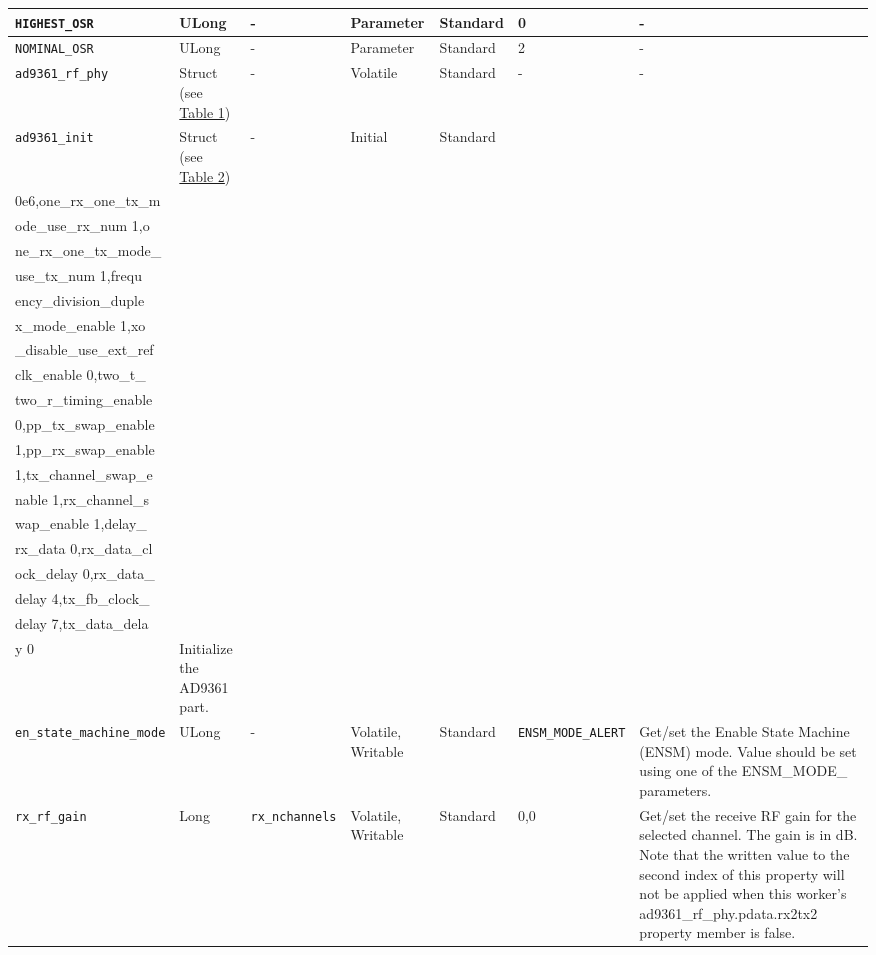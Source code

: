 \documentclass{article}
\begin{document}
\begin{landscape}
\begin{scriptsize}
\begin{longtable}{|p{3.6cm}|p{8.1cm}|p{1.4cm}|p{1.3cm}|p{1.4cm}|p{2.5cm}|p{3.6cm}|}
			\hline
      \verb+HIGHEST_OSR+               & ULong        & -               & Parameter             & Standard                         & 0                   & - \\
			\hline
      \verb+NOMINAL_OSR+               & ULong        & -               & Parameter             & Standard                         & 2                   & - \\
			\hline
			\verb+ad9361_rf_phy+ & Struct (see \hyperlink{tab1}{Table 1})  & - & Volatile & Standard & - & - \\
			\hline
			\verb+ad9361_init+ & Struct (see \hyperlink{tab2}{Table 2}) & - & Initial & Standard & \begin{tabular}{l}reference\_clk\_rate 4\\0e6,one\_rx\_one\_tx\_m\\ode\_use\_rx\_num 1,o\\ne\_rx\_one\_tx\_mode\_\\use\_tx\_num 1,frequ\\ency\_division\_duple\\x\_mode\_enable 1,xo\\\_disable\_use\_ext\_ref\\clk\_enable 0,two\_t\_\\two\_r\_timing\_enable\\ 0,pp\_tx\_swap\_enable\\ 1,pp\_rx\_swap\_enable\\ 1,tx\_channel\_swap\_e\\nable 1,rx\_channel\_s\\wap\_enable 1,delay\_\\rx\_data 0,rx\_data\_cl\\ock\_delay 0,rx\_data\_\\delay 4,tx\_fb\_clock\_\\delay 7,tx\_data\_dela\\y 0\end{tabular} & Initialize the AD9361 part. \\
			\hline   
			\verb+en_state_machine_mode+ & ULong & - & Volatile, Writable & Standard & \verb+ENSM_MODE_ALERT+ & Get/set the Enable State Machine (ENSM) mode. Value should be set using one of the ENSM\_MODE\_ parameters.\\
			\hline
			\verb+rx_rf_gain+ & Long & \verb+rx_nchannels+ & Volatile, Writable & Standard & 0,0 & Get/set the receive RF gain for the selected channel. The gain is in dB. Note that the written value to the second index of this property will not be applied when this worker's ad9361\_rf\_phy.pdata.rx2tx2 property member is false.\\

\end{longtable}
\end{scriptsize}
\end{landscape}
\end{document}
